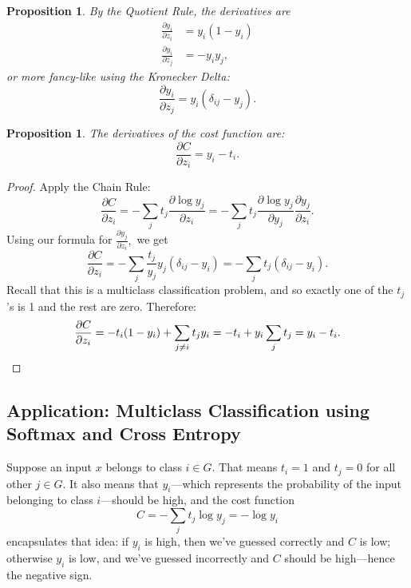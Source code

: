 \documentclass[12pt]{article}
\theoremstyle{plain}
\newtheorem{proposition}[theorem]{Proposition}
\theoremstyle{definition}
\theoremstyle{remark}
\begin{document}
\begin{mdframed}
\begin{proposition}
By the Quotient Rule, the derivatives are
\begin{align*}
\frac{\partial y_i}{\partial z_i} &= y_i(1 - y_i) \\
\frac{\partial y_i}{\partial z_j} &= -y_i y_j,
\end{align*}
or more fancy-like using the Kronecker Delta:
$$\frac{\partial y_i}{\partial z_j} = y_i(\delta_{ij} - y_j).$$
\end{proposition}
\end{mdframed}

\begin{mdframed}
\begin{proposition}
The derivatives of the cost function are:
$$\frac{\partial C}{\partial z_i} = y_i - t_i.$$
\end{proposition}
\end{mdframed}

\begin{proof}
Apply the Chain Rule:
$$\frac{\partial C}{\partial z_i} = - \sum_j t_j \frac{\partial \log y_j}{\partial z_i} = - \sum_j t_j \frac{\partial \log y_j}{\partial y_j} \frac{\partial y_j}{\partial z_i}.$$
Using our formula for $\frac{\partial y_j}{\partial z_i},$ we get 
$$\frac{\partial C}{\partial z_i} = - \sum_j \frac{t_j}{y_j} y_j(\delta_{ij} - y_i) = - \sum_j t_j (\delta_{ij} - y_i).$$
Recall that this is a multiclass classification problem, and so exactly one of the $t_j$'s is 1 and the rest are zero. Therefore:
$$\frac{\partial C}{\partial z_i} = - t_i (1 - y_i) + \sum_{j\neq i} t_j y_i = - t_i + y_i \sum_j t_j = y_i - t_i.\qedhere$$
\end{proof}

\subsection{Application: Multiclass Classification using Softmax and Cross Entropy}

Suppose an input $x$ belongs to class $i \in G.$ That means $t_i = 1$ and $t_j = 0$ for all other $j \in G.$ It also means that $y_i$---which represents the probability of the input belonging to class $i$---should be high, and the cost function $$C = - \sum_j t_j \log y_j = - \log y_i$$ encapsulates that idea: if $y_i$ is high, then we've guessed correctly and $C$ is low; otherwise $y_i$ is low, and we've guessed incorrectly and $C$ should be high---hence the negative sign.
\end{document}
